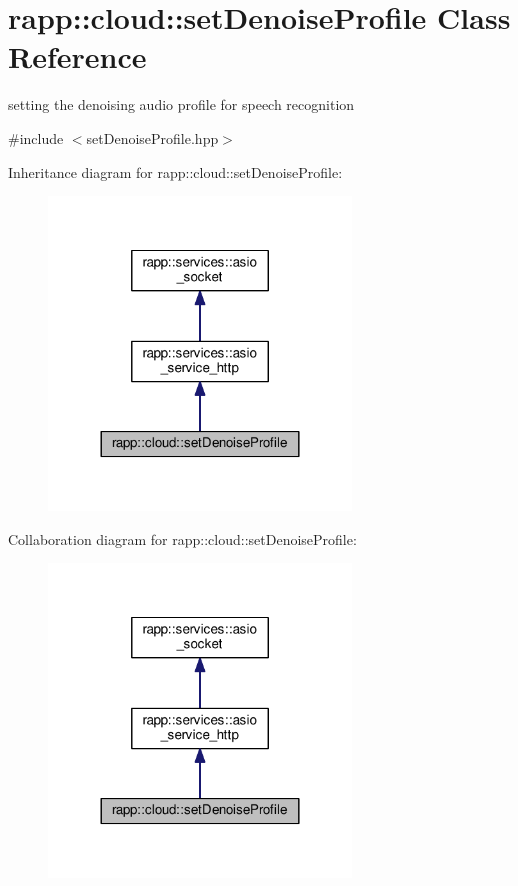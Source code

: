 \hypertarget{classrapp_1_1cloud_1_1setDenoiseProfile}{\section{rapp\-:\-:cloud\-:\-:set\-Denoise\-Profile Class Reference}
\label{classrapp_1_1cloud_1_1setDenoiseProfile}
}


setting the denoising audio profile for speech recognition  




{\ttfamily \#include $<$set\-Denoise\-Profile.\-hpp$>$}



Inheritance diagram for rapp\-:\-:cloud\-:\-:set\-Denoise\-Profile\-:
\nopagebreak
\begin{figure}[H]
\begin{center}
\leavevmode
\includegraphics[width=228pt]{classrapp_1_1cloud_1_1setDenoiseProfile__inherit__graph}
\end{center}
\end{figure}


Collaboration diagram for rapp\-:\-:cloud\-:\-:set\-Denoise\-Profile\-:
\nopagebreak
\begin{figure}[H]
\begin{center}
\leavevmode
\includegraphics[width=228pt]{classrapp_1_1cloud_1_1setDenoiseProfile__coll__graph}
\end{center}
\end{figure}
